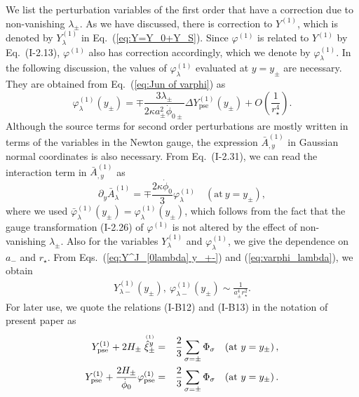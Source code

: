 \documentclass[a4paper,showpacs,preprintnumbers,amsmath,amssymb]{revtex4}
\begin{document}
We list the perturbation variables of the first order that have a correction due to non-vanishing $\lambda_\pm$. 
As we have discussed, there is correction to $Y^{(1)}$, which is denoted by $Y^{(1)}_{ \lambda }$ in Eq.~(\ref{eq:Y=Y_0+Y_S}). 
Since $\varphi^{(1)}$ is related to $Y^{(1)}$ by Eq.~(I-2.13), 
$\varphi^{(1)}$ also has correction accordingly, which we denote by $\varphi^{(1)}_{ \lambda }$.
In the following discussion, the values of $\varphi^{(1)}_{ \lambda }$ evaluated at $y=y_\pm$ are necessary. They are obtained from Eq.~(\ref{eq:Jun of varphi}) as 
\begin{equation}
\varphi_{ \lambda }^{(1)}(y_\pm)
     = \mp\frac{3\lambda_\pm}{2\kappa a_\pm^2\dot\phi_{0\pm}}
         \Delta  Y^{(1)}_{ \mathrm{pse} }(y_\pm)
     + O\left( \frac{1}{r^4_\star} \right) . 
\label{eq:varphi_lambda}
\end{equation}
Although the source terms for second order perturbations are mostly written in terms of the variables in the Newton gauge, the expression $\bar A^{(1)}_{,y}$  in Gaussian normal coordinates is also necessary. 
From Eq.~(I-2.31), we can read the interaction term in 
$\bar A^{(1)}_{,y}$ as
\begin{equation}
\partial_y\bar A^{(1)}_{ \lambda }=\mp \frac{2\kappa \dot{\phi}_0}{3}
         \varphi_{ \lambda }^{(1)}
 \quad   ({\mathrm{at~}} y=y_\pm) , 
\end{equation}
where we used 
$\bar \varphi_{ \lambda }^{(1)}(y_\pm) = \varphi_{\lambda}^{(1)}(y_\pm)$, which follows from the fact that the gauge transformation  (I-2.26) of $\varphi^{(1)}$ is not altered by the effect of non-vanishing $\lambda_\pm$. 
Also for the variables $Y_{ \lambda }^{(1)}$ and
$\varphi^{(1)}_{ \lambda }$, we give the dependence on $a_-$ and $r_\star$.  
From Eqs.~(\ref{eq:Y^J_[0lambda] y_+-}) and (\ref{eq:varphi_lambda}), we obtain 
\begin{eqnarray}
    Y_{ \lambda -}^{(1)}(y_\pm),~
    \varphi_{ \lambda -}^{(1)}(y_\pm)  
    \sim \frac{1}{a_\pm^4 r_\star^2}. 
\end{eqnarray}
For later use, we quote the relations (I-B12) and (I-B13) in the notation of present paper as 
\begin{eqnarray}
  Y^{(1)}_{ \mathrm{pse} } + 2H_\pm \stackrel{\scriptscriptstyle {(1)}}{\hat\xi^y_\pm}  
     &=& \frac{2}{3} \sum _{\sigma=\pm }  \Phi_\sigma  
     \quad (\mathrm{at~} y=y_\pm)
\,, 
\nonumber
\\
    Y^{(1)}_{ \mathrm{pse} }   
    + \frac{2H_\pm}{\dot\phi_{0} } 
       \varphi^{(1)}_{ \mathrm{pse} }  
    &=& \frac{2}{3} \sum_{\sigma=\pm}  \Phi_\sigma   
       \quad (\mathrm{at~} y=y_\pm)
\,. 
\label{eq:comb Y varphi} 
\end{eqnarray}
\end{document}
